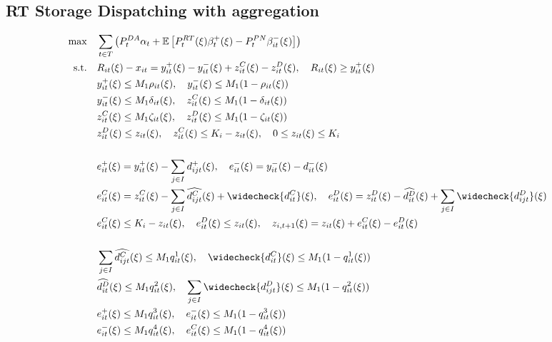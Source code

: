 \documentclass[10pt]{article}
\begin{document}
\newpage

\subsection{RT Storage Dispatching with aggregation}
\begin{align*}
    \text{max} \quad &\sum_{t\in T}\left(P_t^{DA} \alpha_{t} + \mathbb{E}\left[P_t^{RT}(\xi)\beta_{t}^{+}(\xi) - P_t^{PN}\beta_{it}^{-}(\xi)\right]\right)&\\    
    \text{s.t.} \quad &R_{it}(\xi) - x_{it} = y_{it}^{+}(\xi) - y_{it}^{-}(\xi) + z^C_{it}(\xi) - z^D_{it}(\xi), \quad R_{it}(\xi) \geq y^+_{it}(\xi)&\\
    &y^+_{it}(\xi) \leq M_1 \rho_{it}(\xi), \quad y^-_{it}(\xi) \leq M_1 (1 - \rho_{it}(\xi)) &\\
    &y^-_{it}(\xi) \leq M_1 \delta_{it}(\xi), \quad z^C_{it}(\xi) \leq M_1 (1 - \delta_{it}(\xi)) &\\
    &z^C_{it}(\xi) \leq M_1 \zeta_{it}(\xi), \quad z^D_{it}(\xi) \leq M_1 (1 - \zeta_{it}(\xi)) &\\
    &z^D_{it}(\xi) \le z_{it}(\xi), \quad z^C_{it}(\xi) \le K_i-z_{it}(\xi), \quad 0 \leq z_{it}(\xi) \leq K_i &\\
    &&\\
    &e^+_{it}(\xi) = y^+_{it}(\xi) - \sum_{j \in I}d^{+}_{ijt}(\xi), \quad e^-_{it}(\xi) = y^-_{it}(\xi) - d^{-}_{it}(\xi) &\\
    &e^C_{it}(\xi) = z^C_{it}(\xi) - \sum_{j \in I}\widehat{d^{C}_{ijt}}(\xi) + \widecheck{d^{C}_{it}}(\xi), \quad e^D_{it}(\xi) = z^D_{it}(\xi) - \widehat{d^{D}_{it}}(\xi) + \sum_{j \in I}\widecheck{d^{D}_{ijt}}(\xi) &\\
    &e^C_{it}(\xi) \leq K_i - z_{it}(\xi), \quad e^D_{it}(\xi) \leq z_{it}(\xi), \quad z_{i,t+1}(\xi) = z_{it}(\xi) + e^C_{it}(\xi) - e^D_{it}(\xi) &\\
    &&\\
    &\sum_{j \in I}\widehat{d^{C}_{ijt}}(\xi) \leq M_1 q^1_{it}(\xi), \quad \widecheck{d^{C}_{it}}(\xi) \leq M_1 (1 - q^1_{it}(\xi)) &\\
    &\widehat{d^{D}_{it}}(\xi) \leq M_1 q^2_{it}(\xi), \quad \sum_{j \in I}\widecheck{d^{D}_{ijt}}(\xi) \leq M_1 (1 - q^2_{it}(\xi)) &\\
    &e^{+}_{it}(\xi) \leq M_1 q^3_{it}(\xi), \quad e^{-}_{it}(\xi) \leq M_1 (1 - q^3_{it}(\xi)) &\\
    &e^{-}_{it}(\xi) \leq M_1 q^4_{it}(\xi), \quad e^{C}_{it}(\xi) \leq M_1 (1 - q^4_{it}(\xi)) &\\

\end{align*}
\end{document}
